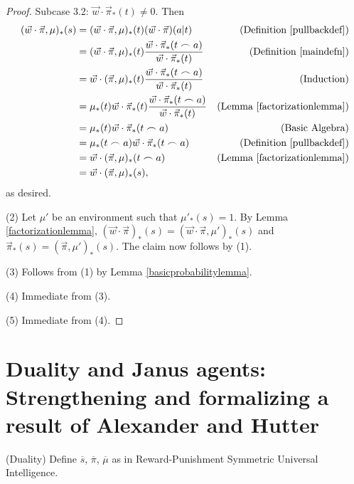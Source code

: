 \documentclass[runningheads]{llncs}
\begin{document}
\begin{proof}
    Subcase 3.2: $\vec w\cdot \vec\pi_*(t)\not=0$. Then
    \begin{align*}
        (\vec w\cdot\vec\pi,\mu)_*(s)
            &= (\vec w\cdot\vec\pi,\mu)_*(t)(\vec w\cdot\vec\pi)(a|t)
                &\mbox{(Definition \ref{pullbackdef})}\\
            &= (\vec w\cdot\vec\pi,\mu)_*(t)
                \frac
                {\vec w\cdot\vec\pi_*(t\frown a)}
                {\vec w\cdot\vec\pi_*(t)}
                &\mbox{(Definition \ref{maindefn})}\\
            &= \vec w\cdot (\vec\pi,\mu)_*(t)
                \frac
                {\vec w\cdot\vec\pi_*(t\frown a)}
                {\vec w\cdot\vec\pi_*(t)}
                &\mbox{(Induction)}\\
            &= \mu_*(t)\vec w\cdot \vec\pi_*(t)
                \frac
                {\vec w\cdot\vec\pi_*(t\frown a)}
                {\vec w\cdot\vec\pi_*(t)}
                &\mbox{(Lemma \ref{factorizationlemma})}\\
            &= \mu_*(t)\vec w\cdot\vec\pi_*(t\frown a)
                &\mbox{(Basic Algebra)}\\
            &= \mu_*(t\frown a)\vec w\cdot\vec\pi_*(t\frown a)
                &\mbox{(Definition \ref{pullbackdef})}\\
            &= \vec w\cdot(\vec\pi,\mu)_*(t\frown a)
                &\mbox{(Lemma \ref{factorizationlemma})}\\
            &= \vec w\cdot(\vec\pi,\mu)_*(s),
    \end{align*}
    as desired.

    (2) Let $\mu'$ be an environment such that $\mu'_*(s)=1$.
        By Lemma \ref{factorizationlemma},
        $(\vec w\cdot\vec\pi)_*(s)=(\vec w\cdot\vec\pi,\mu')_*(s)$
        and $\vec\pi_*(s)=(\vec\pi,\mu')_*(s)$. The claim now follows by (1).

    (3) Follows from (1) by Lemma \ref{basicprobabilitylemma}.

    (4) Immediate from (3).

    (5) Immediate from (4).
\end{proof}

\section{Duality and Janus agents:
Strengthening and formalizing a result of Alexander and Hutter}

\begin{definition}
    (Duality) Define $\overline s$, $\overline \pi$, $\overline \mu$
    as in Reward-Punishment Symmetric Universal Intelligence.
\end{definition}
\end{document}
